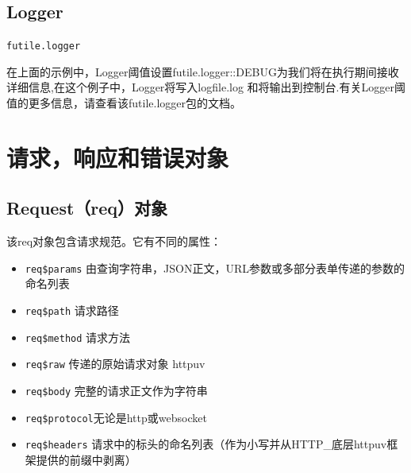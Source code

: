 \documentclass[]{book}
\newenvironment{Shaded}{\begin{snugshade}}{\end{snugshade}}
\newcommand{\KeywordTok}[1]{\textcolor[rgb]{0.13,0.29,0.53}{\textbf{#1}}}
\newcommand{\DataTypeTok}[1]{\textcolor[rgb]{0.13,0.29,0.53}{#1}}
\newcommand{\StringTok}[1]{\textcolor[rgb]{0.31,0.60,0.02}{#1}}
\newcommand{\OtherTok}[1]{\textcolor[rgb]{0.56,0.35,0.01}{#1}}
\newcommand{\ControlFlowTok}[1]{\textcolor[rgb]{0.13,0.29,0.53}{\textbf{#1}}}
\newcommand{\OperatorTok}[1]{\textcolor[rgb]{0.81,0.36,0.00}{\textbf{#1}}}
\newcommand{\NormalTok}[1]{#1}
\providecommand{\tightlist}{%
  \setlength{\itemsep}{0pt}\setlength{\parskip}{0pt}}
\begin{document}
\subsection{Logger}\label{logger}

\texttt{futile.logger}

\begin{Shaded}
\end{Shaded}

在上面的示例中，Logger阈值设置futile.logger::DEBUG为我们将在执行期间接收详细信息,在这个例子中，Logger将写入logfile.log
和将输出到控制台.有关Logger阈值的更多信息，请查看该futile.logger包的文档。

\section{请求，响应和错误对象}

\subsection{Request（req）对象}\label{requestreq}

该req对象包含请求规范。它有不同的属性：

\begin{itemize}
\tightlist
\item
  \texttt{req\$params}
  由查询字符串，JSON正文，URL参数或多部分表单传递的参数的命名列表
\item
  \texttt{req\$path} 请求路径
\item
  \texttt{req\$method} 请求方法
\item
  \texttt{req\$raw} 传递的原始请求对象 httpuv
\item
  \texttt{req\$body} 完整的请求正文作为字符串
\item
  \texttt{req\$protocol}无论是http或websocket
\item
  \texttt{req\$headers}
  请求中的标头的命名列表（作为小写并从HTTP\_底层httpuv框架提供的前缀中剥离）
\end{itemize}
\end{document}
